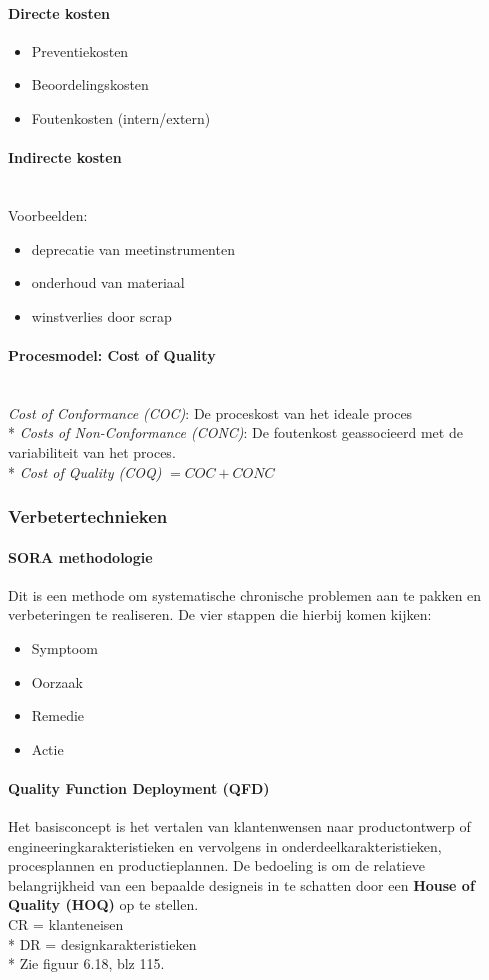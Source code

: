 \documentclass[12pt]{article}
\begin{document}
\paragraph{Directe kosten}
\begin{itemize}
\item Preventiekosten
\item Beoordelingskosten
\item Foutenkosten (intern/extern)
\end{itemize}
\paragraph{Indirecte kosten}\mbox{}\\
Voorbeelden:
\begin{itemize}
\item deprecatie van meetinstrumenten
\item onderhoud van materiaal
\item winstverlies door scrap
\end{itemize}
\paragraph{Procesmodel: Cost of Quality}\mbox{}\\
\textit{Cost of Conformance (COC)}: De proceskost van het ideale proces\\*
\textit{Costs of Non-Conformance (CONC)}: De foutenkost geassocieerd met de variabiliteit van het proces.\\*
\textit{Cost of Quality (COQ)} $= COC + CONC$
\subsubsection{Verbetertechnieken}
\paragraph{SORA methodologie}
Dit is een methode om systematische chronische problemen aan te pakken en verbeteringen te realiseren. De vier stappen die hierbij komen kijken:
\begin{itemize}
\item Symptoom
\item Oorzaak
\item Remedie
\item Actie
\end{itemize}
\paragraph{Quality Function Deployment (QFD)}
Het basisconcept is het vertalen van klantenwensen naar productontwerp of engineeringkarakteristieken en vervolgens in onderdeelkarakteristieken, procesplannen en productieplannen. De bedoeling is om de relatieve belangrijkheid van een bepaalde designeis in te schatten door een \textbf{House of Quality (HOQ)} op te stellen.\\
CR = klanteneisen\\*
DR = designkarakteristieken\\*
Zie figuur 6.18, blz 115.
\end{document}
